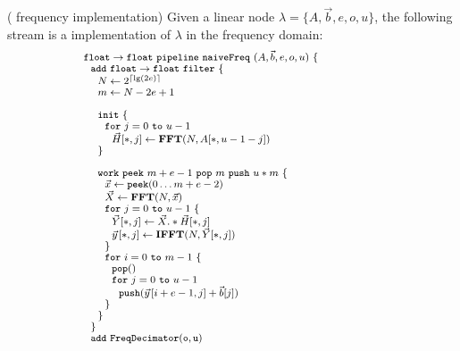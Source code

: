 \begin{transformation} ({\Naive} frequency implementation)
Given a linear node $\lambda = \{A, {\vec b}, e, o, u\}$, the
following stream is a {\naive} implementation of $\lambda$ in the
frequency domain:
\begin{equation} \nonumber
{\small
  \begin{array}{ll}
    {\tt float \rightarrow float}~{\tt pipeline~naiveFreq~}(A, {\vec b}, e, o, u){\tt ~\{} & \hspace{40pt}\\
    ~~{\tt add~float \rightarrow float~filter~\{}\\
    ~~~~N \leftarrow 2^{\lceil \lg(2e) \rceil} \\
    ~~~~m \leftarrow N-2e+1 \\
    \\
    ~~~~{\tt init}~{\tt \{} \\
    ~~~~~~{\tt for}~j=0~{\tt to}~u-1\\
    ~~~~~~~~\vec{H}[*,j] \leftarrow \mathbf{FFT}(N,A[*,u-1-j]) \\
    ~~~~{\tt \}} \\
    \\
    ~~~~{\tt work}~{\tt peek}~m+e-1~{\tt pop}~m~{\tt push}~u*m~{\tt \{} \\
    ~~~~~~\vec{x} \leftarrow {\tt peek}(0 \dots m+e-2 ) \\
    ~~~~~~\vec{X} \leftarrow \mathbf{FFT} (N, \vec{x}) \\
    ~~~~~~{\tt for}~j=0~{\tt to}~u-1~{\tt \{}\\
    ~~~~~~~~\vec{Y}[*,j] \leftarrow \vec{X} .* \vec{H}[*,j] \\
    ~~~~~~~~\vec{y}\hspace{1pt}[*,j] \leftarrow \mathbf{IFFT}(N, \vec{Y}[*,j]) \\
    ~~~~~~{\tt \}} \\
    ~~~~~~{\tt for}~i=0~{\tt to}~m-1~{\tt \{}\\
    ~~~~~~~~{\tt pop()} \\
    ~~~~~~~~{\tt for}~j=0~{\tt to}~u-1\\
    ~~~~~~~~~~{\tt push}(\vec{y}\hspace{1pt}[i+e-1,j] + {\vec b}[j])\\
    ~~~~~~{\tt \}} \\
    ~~~~{\tt \}} \\
    ~~{\tt \}} \\
    ~~{\tt add~FreqDecimator(o, u)} \\

\end{array}}
\end{equation}
\end{transformation}
